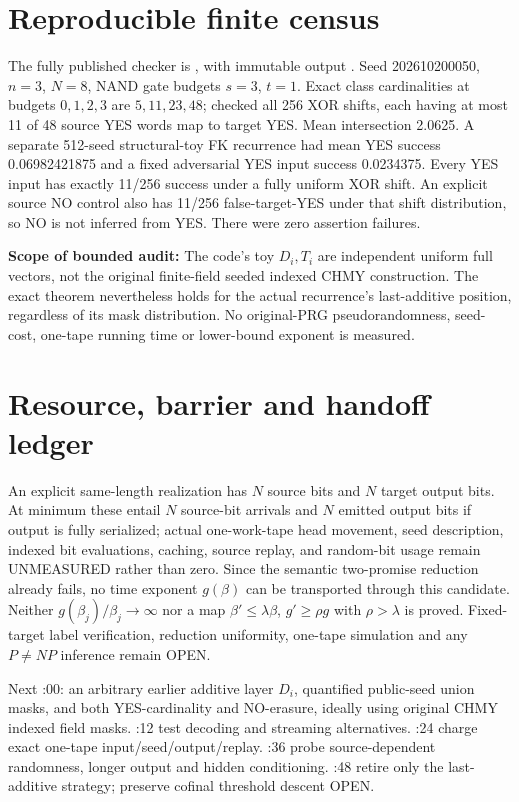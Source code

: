\documentclass[11pt]{article}
\begin{document}
\section*{Reproducible finite census}
The fully published checker is
, with immutable output
.
Seed 202610200050, $n=3$, $N=8$, NAND gate budgets $s=3$, $t=1$.
Exact class cardinalities at budgets $0,1,2,3$ are $5,11,23,48$; checked all 256 XOR shifts, each having at most 11 of 48 source YES words map to target YES. Mean intersection 2.0625. A separate 512-seed structural-toy FK recurrence had mean YES success 0.06982421875 and a fixed adversarial YES input success 0.0234375. Every YES input has exactly 11/256 success under a fully uniform XOR shift. An explicit source NO control also has 11/256 false-target-YES under that shift distribution, so NO is not inferred from YES. There were zero assertion failures.

\textbf{Scope of bounded audit:} The code's toy $D_i,T_i$ are independent uniform full vectors, not the original finite-field seeded indexed CHMY construction. The exact theorem nevertheless holds for the actual recurrence's last-additive position, regardless of its mask distribution. No original-PRG pseudorandomness, seed-cost, one-tape running time or lower-bound exponent is measured.

\section*{Resource, barrier and handoff ledger}
An explicit same-length realization has $N$ source bits and $N$ target output bits. At minimum these entail $N$ source-bit arrivals and $N$ emitted output bits if output is fully serialized; actual one-work-tape head movement, seed description, indexed bit evaluations, caching, source replay, and random-bit usage remain UNMEASURED rather than zero. Since the semantic two-promise reduction already fails, no time exponent $g(\beta)$ can be transported through this candidate. Neither $g(\beta_j)/\beta_j\to\infty$ nor a map $\beta'\le\lambda\beta$, $g'\ge\rho g$ with $\rho>\lambda$ is proved. Fixed-target label verification, reduction uniformity, one-tape simulation and any $P\ne NP$ inference remain OPEN.

Next :00: an arbitrary earlier additive layer $D_i$, quantified public-seed union masks, and both YES-cardinality and NO-erasure, ideally using original CHMY indexed field masks. :12 test decoding and streaming alternatives. :24 charge exact one-tape input/seed/output/replay. :36 probe source-dependent randomness, longer output and hidden conditioning. :48 retire only the last-additive strategy; preserve cofinal threshold descent OPEN.
\end{document}
